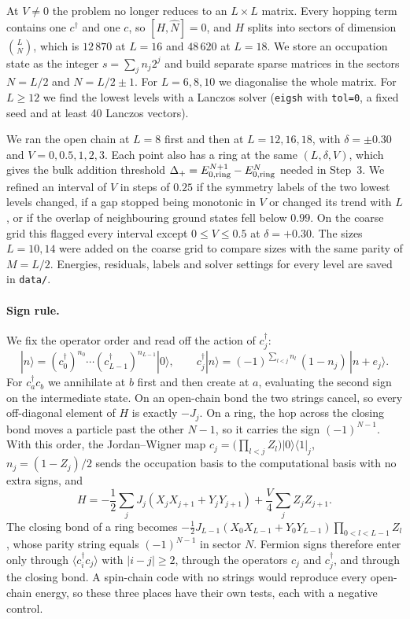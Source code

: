 \documentclass[11pt,a4paper]{article}
\newcommand{\dg}{^{\dagger}}
\begin{document}
At $V\neq0$ the problem no longer reduces to an $L\times L$ matrix.
Every hopping term contains one $c\dg$ and one $c$, so $[H,\hat N]=0$, and $H$ splits into sectors of dimension $\binom{L}{N}$, which is $12\,870$ at $L=16$ and $48\,620$ at $L=18$.
We store an occupation state as the integer $s=\sum_j n_j2^j$ and build separate sparse matrices in the sectors $N=L/2$ and $N=L/2\pm1$.
For $L=6,8,10$ we diagonalise the whole matrix.
For $L\ge12$ we find the lowest levels with a Lanczos solver (\texttt{eigsh} with \texttt{tol=0}, a fixed seed and at least 40 Lanczos vectors).

We ran the open chain at $L=8$ first and then at $L=12,16,18$, with $\delta=\pm0.30$ and $V=0,0.5,1,2,3$.
Each point also has a ring at the same $(L,\delta,V)$, which gives the bulk addition threshold $\Delta_+=E_{0,\rm ring}^{N+1}-E_{0,\rm ring}^{N}$ needed in Step~3.
We refined an interval of $V$ in steps of $0.25$ if the symmetry labels of the two lowest levels changed, if a gap stopped being monotonic in $V$ or changed its trend with $L$, or if the overlap of neighbouring ground states fell below $0.99$.
On the coarse grid this flagged every interval except $0\le V\le0.5$ at $\delta=+0.30$.
The sizes $L=10,14$ were added on the coarse grid to compare sizes with the same parity of $M=L/2$.
Energies, residuals, labels and solver settings for every level are saved in \texttt{data/}.

\paragraph{Sign rule.}
We fix the operator order and read off the action of $c_j\dg$:
\begin{equation}
  |n\rangle = (c_0\dg)^{n_0}\cdots(c_{L-1}\dg)^{n_{L-1}}|0\rangle,
  \qquad
  c_j\dg|n\rangle = (-1)^{\sum_{l<j}n_l}\,(1-n_j)\,|n+e_j\rangle .
\end{equation}
For $c_a\dg c_b$ we annihilate at $b$ first and then create at $a$, evaluating the second sign on the intermediate state.
On an open-chain bond the two strings cancel, so every off-diagonal element of $H$ is exactly $-J_j$.
On a ring, the hop across the closing bond moves a particle past the other $N-1$, so it carries the sign $(-1)^{N-1}$.
With this order, the Jordan--Wigner map $c_j=\big(\prod_{l<j}Z_l\big)|0\rangle\langle1|_j$, $n_j=(1-Z_j)/2$ sends the occupation basis to the computational basis with no extra signs, and
\begin{equation}
  H = -\frac12\sum_j J_j\left(X_jX_{j+1}+Y_jY_{j+1}\right) + \frac V4\sum_j Z_jZ_{j+1} .
  \label{eq:jw}
\end{equation}
The closing bond of a ring becomes $-\tfrac12J_{L-1}(X_0X_{L-1}+Y_0Y_{L-1})\prod_{0<l<L-1}Z_l$, whose parity string equals $(-1)^{N-1}$ in sector $N$.
Fermion signs therefore enter only through $\langle c_i\dg c_j\rangle$ with $|i-j|\ge2$, through the operators $c_j$ and $c_j\dg$, and through the closing bond.
A spin-chain code with no strings would reproduce every open-chain energy, so these three places have their own tests, each with a negative control.
\end{document}
